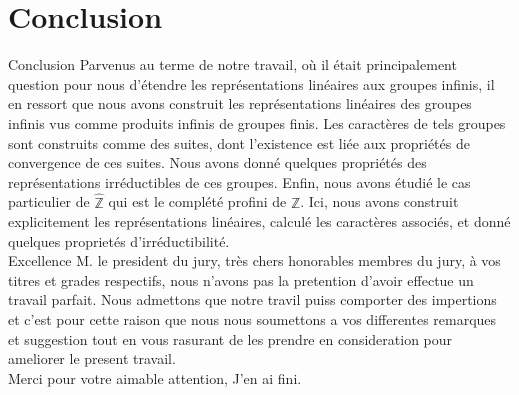 \documentclass[9pt]{beamer}
\begin{document}
	\section{Conclusion}
	\begin{frame}{Conclusion}
	Parvenus au terme de notre travail, où il était principalement question pour nous d'étendre les représentations linéaires aux groupes infinis, il en ressort que nous avons construit les représentations linéaires des groupes infinis vus comme produits infinis de groupes finis.
	Les caractères de tels groupes sont construits comme des suites, dont l'existence est liée aux propriétés de convergence de ces suites. Nous avons donné quelques propriétés des représentations irréductibles de ces groupes.
	Enfin, nous avons étudié le cas particulier de \(\widehat{\mathbb{Z}}\) qui est le complété profini de \( \mathbb{Z} \). Ici, nous avons construit explicitement les représentations linéaires, calculé les caractères associés, et donné quelques proprietés d’irréductibilité.\\
	Excellence M. le president du jury, très chers honorables membres du jury, à vos titres et grades respectifs, nous n'avons pas la pretention d'avoir effectue un travail parfait. Nous admettons que notre travil puiss comporter des impertions et c'est pour cette raison que nous nous soumettons a vos differentes remarques et suggestion tout en vous rasurant de les prendre en consideration pour ameliorer le present travail.\\
	
	Merci pour votre aimable attention, J'en ai fini.
	\end{frame}
	
	
\end{document}
